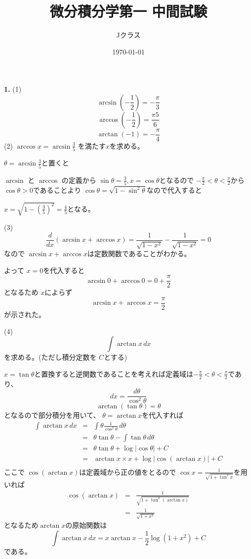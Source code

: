 \documentclass[dvipdfmx,twocolumn]{jsarticle}
\title{微分積分学第一 中間試験}
\author{Jクラス}
\date{\today}
\begin{document}
\maketitle
\textbf{1.}
(1)
\[\arcsin (- \frac{1}{2}) = - \frac{\pi}{3}\]
\[\arccos (- \frac{1}{2}) = \frac{\pi 5}{6}\]
\[\arctan (-1) = - \frac{\pi}{4}\]
(2)
$\arccos x = \arcsin \frac{3}{5}$ を満たす$x$を求める。

$\theta = \arcsin \frac{3}{5}$と置くと

$\arcsin$ と $\arccos$ の定義から
$\sin \theta = \frac{3}{5} , x = \cos \theta$となるので
$- \frac{\pi}{2} < \theta < \frac{\pi}{2}$から $\cos \theta  > 0$であることより
$\cos \theta = \sqrt{1 - \sin^2 \theta}$なので代入すると

$x = \sqrt{1 - (\frac{3}{5})^2} = \frac{4}{5}$となる。

(3)
\[
\frac{d}{dx} (\arcsin x + \arccos x) = \frac{1}{\sqrt{1 - x^2}} - \frac{1}{\sqrt{1 - x^2}} = 0
\]
なので $\arcsin x + \arccos x$は定数関数であることがわかる。

よって $x = 0$を代入すると
\[\arcsin 0 + \arccos 0 = 0 + \frac{\pi}{2}\]
となるため
$x$によらず
\[\arcsin x + \arccos x = \frac{\pi}{2}\]
が示された。

(4)
\[
\int \arctan x \, dx
\]
を求める。(ただし積分定数を $C$とする)

$x = \tan \theta$と置換すると逆関数であることを考えれば定義域は$- \frac{\pi}{2} < \theta < \frac{\pi}{2}$であり、
\[dx = \frac{d \theta}{\cos^2 \theta}\]
\[\arctan (\tan \theta) = \theta\]
となるので部分積分を用いて、 $\theta = \arctan x$を代入すれば
\begin{eqnarray*}
  \int \arctan x \, dx & = & \int \theta \frac{1}{\cos^2 \theta} \, d \theta \\
  & = & \theta \tan \theta - \int \tan \theta \,d \theta \\
  & = & \theta \tan \theta + \log |\cos \theta| + C \\
  & = & \arctan x \times x + \log |\cos (\arctan x)| + C \\
\end{eqnarray*}
ここで $\cos (\arctan x)$は定義域から正の値をとるので $\cos x = \frac{1}{\sqrt{1 + \tan^2 x}}$を用いれば
\begin{eqnarray*}
  \cos (\arctan x) & = & \frac{1}{\sqrt{1 + \tan^2 (\arctan x)}} \\
  & = & \frac{1}{\sqrt{1 + x^2}}
\end{eqnarray*}
となるため$\arctan x$の原始関数は
\[
\int \arctan x \, dx = x\arctan x - \frac{1}{2} \log (1 + x^2) + C
\]
である。 \\
\end{document}
